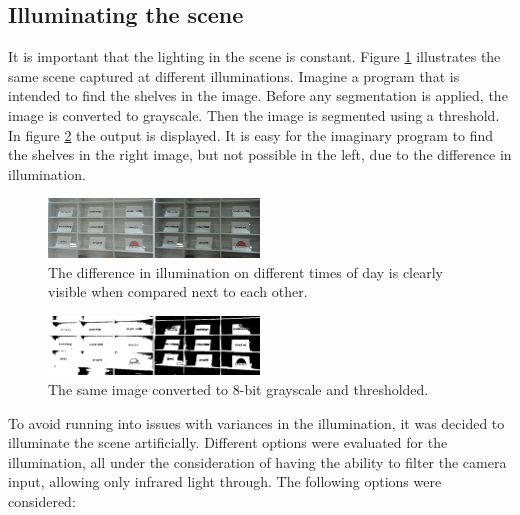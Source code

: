 
\subsection{Illuminating the scene}

It is important that the lighting in the scene is constant. Figure \ref{fig:scene_light} illustrates the same scene captured at different illuminations. Imagine a program that is intended to find the shelves in the image. Before any segmentation is applied, the image is converted to grayscale. Then the image is segmented using a threshold. In figure \ref{fig:scene_thresholded} the output is displayed. It is easy for the imaginary program to find the shelves in the right image, but not possible in the left, due to the difference in illumination.  

\begin{figure}[htbp] 
\centering 
\includegraphics[width=0.5\textwidth]{Pictures/HjoerringLibrary/scene_lighting.png} 
\caption{The difference in illumination on different times of day is clearly visible when compared next to each other.} 
\label{fig:scene_light} 
\end{figure}

\begin{figure}[htbp] 
\centering 
\includegraphics[width=0.5\textwidth]{Pictures/HjoerringLibrary/scene_lighting_thresholded.png} 
\caption{The same image converted to 8-bit grayscale and thresholded.} 
\label{fig:scene_thresholded} 
\end{figure}

To avoid running into issues with variances in the illumination, it was decided to illuminate the scene artificially. Different options were evaluated for the illumination, all under the consideration of having the ability to filter the camera input, allowing only infrared light through. The following options were considered:


